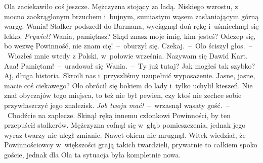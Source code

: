 \documentclass[../MAIN.tex]{subfiles}
\begin{document}
Ola zaciekawiło coś jeszcze. Mężczyzna stojący za ladą. Niskiego wzrostu, z mocno zaokrąglonym brzuchem i~bujnym, sumiastym wąsem zasłaniającym górną wargę. Wania! Stalker podszedł do Barmana, wyciągnął doń rękę i~uśmiechnął się lekko.
\sx \textit{Prywiet!} Wania, pamiętasz?
\xx Skąd znasz moje imię, kim jesteś? Odczep się, bo wezwę Powinność, nie znam cię!~--~oburzył się.
\xx Czekaj.~--~Olo ściszył głos.~--~Wiozłeś mnie wtedy z Polski, w~połowie września. Nazywam się Dawid Kart.
\xx Aaa! Pamiętam!~--~uradował się Wania.~--~Ty już tutaj? Jak mogłeś tak szybko?
\xx Aj, długa historia. Skroili nas i~przyszliśmy uzupełnić wyposażenie.
\xx Jasne, jasne, macie coś ciekawego?
\qm
 Olo obrócił się bokiem do lady i~tylko uchylił kieszeń. Nie znał obyczajów tego miejsca, to też nie był pewien, czy ktoś nie zechce sobie przywłaszczyć jego znalezisk.
\sd
\xx \textit{Job twoju mać!}~--~wrzasnął wąsaty gość.~--~Chodźcie na zaplecze.
\qm
Skinął ręką innemu członkowi Powinności, by ten przepuścił stalkerów. Mężczyzna cofnął się w~głąb pomieszczenia, jednak jego wyraz twarzy nie uległ zmianie. Nawet okiem nie mrugnął. Witek wiedział, że Powinnościowcy w~większości grają takich twardzieli, prywatnie to całkiem spoko goście, jednak dla Ola ta sytuacja była kompletnie nowa.
\end{document}
